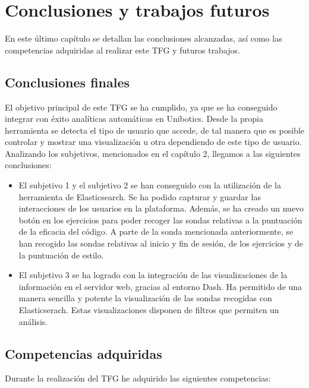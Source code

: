 \chapter{Conclusiones y trabajos futuros}\label{conclusión}

	En este último capítulo se detallan las conclusiones alcanzadas, así como las competencias adquiridas al realizar este TFG y futuros trabajos.
	
	\section{Conclusiones finales} 
	\label{sec:conclusiones_finales} 
El objetivo principal de este TFG se ha cumplido, ya que se ha conseguido integrar con éxito analíticas automáticas en Unibotics. Desde la propia herramienta se detecta el tipo de usuario que accede, de tal manera que es posible controlar y mostrar una visualización u otra dependiendo de este tipo de usuario. Analizando los subjetivos, mencionados en el capítulo 2, llegamos a las siguientes conclusiones:\\

\begin{itemize}
\item  El subjetivo 1 y el subjetivo 2 se han conseguido con la utilización de la herramienta de Elasticsearch. Se ha podido capturar y guardar las interacciones de los usuarios en la plataforma. Además, se ha creado un nuevo botón en los ejercicios para poder recoger las sondas relativas a la puntuación de la eficacia del código. A parte de la sonda mencionada anteriormente, se han recogido las sondas relativas al inicio y fin de sesión, de los ejercicios y de la puntuación de estilo.
\newpage
\item El subjetivo 3 se ha logrado con la integración de las visualizaciones de la información en el servidor web, gracias al entorno Dash. Ha permitido de una manera sencilla y potente la visualización de las sondas recogidas con Elasticserach. Estas visualizaciones disponen de filtros que permiten un análisis.
\end{itemize}

	\section{Competencias adquiridas} 
	\label{sec:competencias_adquiridas} 
	Durante la realización del TFG he adquirido las siguientes competencias:
		
